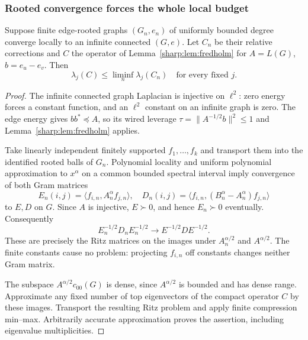 \subsubsection{Rooted convergence forces the whole local budget}
\begin{proposition}\label{sharp:prop:ritz}
Suppose finite edge-rooted graphs $(G_n,e_n)$ of uniformly bounded
degree converge locally to an infinite connected $(G,e)$. Let $C_n$
be their relative corrections and $C$ the operator of
Lemma~\ref{sharp:lem:fredholm} for $A=L(G)$, $b=e_u-e_v$. Then
\[
                 \lambda_j(C)\le\liminf_n\lambda_j(C_n)
                 \quad\text{for every fixed }j.
\]
\end{proposition}
\begin{proof}
The infinite connected graph Laplacian is injective on $\ell^2$:
zero energy forces a constant function, and an $\ell^2$ constant on
an infinite graph is zero. The edge energy gives $bb^*\preceq A$,
so its wired leverage $\tau=\|A^{-1/2}b\|^2\le1$ and
Lemma~\ref{sharp:lem:fredholm} applies.

Take linearly independent finitely supported $f_1,\ldots,f_k$ and
transport them into the identified rooted balls of $G_n$. Polynomial
locality and uniform polynomial approximation to $x^\alpha$ on a
common bounded spectral interval imply convergence of both Gram
matrices
\[
 E_n(i,j)=\langle f_{i,n},A_n^\alpha f_{j,n}\rangle,
 \quad D_n(i,j)=\langle f_{i,n},(B_n^\alpha-A_n^\alpha)f_{j,n}\rangle
\]
to $E,D$ on $G$. Since $A$ is injective, $E\succ0$, and hence
$E_n\succ0$ eventually. Consequently
\[
 E_n^{-1/2}D_nE_n^{-1/2}\longrightarrow E^{-1/2}DE^{-1/2}.
\]
These are precisely the Ritz matrices on the images under
$A_n^{\alpha/2}$ and $A^{\alpha/2}$. The finite constants cause no
problem: projecting $f_{i,n}$ off constants changes neither Gram matrix.

The subspace $A^{\alpha/2}c_{00}(G)$ is dense, since $A^{\alpha/2}$
is bounded and has dense range. Approximate any fixed number of top
eigenvectors of the compact operator $C$ by these images. Transport
the resulting Ritz problem and apply finite compression min--max.
Arbitrarily accurate approximation proves the assertion, including
eigenvalue multiplicities.
\end{proof}

